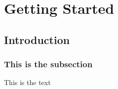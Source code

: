 \chapter{Getting Started}

\section{Introduction}
\subsection{This is the subsection}

This is the text
\lipsum[1-3]
